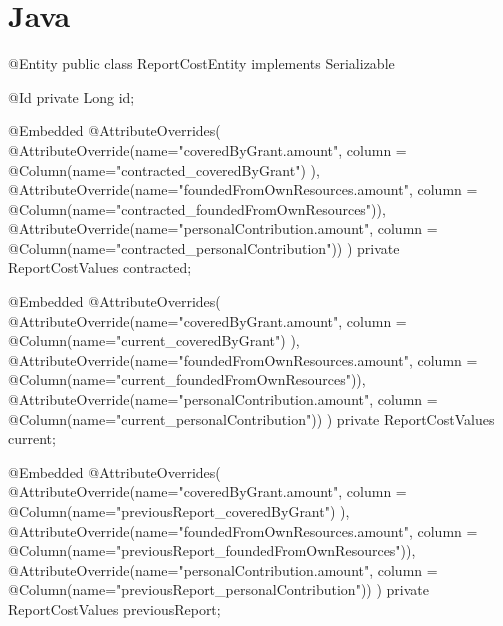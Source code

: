 \section{Java}

\begin{javacode}[Embeddable]
	@Entity 
	public class ReportCostEntity implements  Serializable {
		
		@Id
		private Long id;
		
		@Embedded   
		@AttributeOverrides( {
			@AttributeOverride(name="coveredByGrant.amount", column = @Column(name="contracted_coveredByGrant") ),
			@AttributeOverride(name="foundedFromOwnResources.amount", column = @Column(name="contracted_foundedFromOwnResources")),
			@AttributeOverride(name="personalContribution.amount", column = @Column(name="contracted_personalContribution"))
		} )
		private ReportCostValues contracted;
		
		@Embedded
		@AttributeOverrides( {
			@AttributeOverride(name="coveredByGrant.amount", column = @Column(name="current_coveredByGrant") ),
			@AttributeOverride(name="foundedFromOwnResources.amount", column = @Column(name="current_foundedFromOwnResources")),
			@AttributeOverride(name="personalContribution.amount", column = @Column(name="current_personalContribution"))
		} )
		private ReportCostValues current;
		
		@Embedded 
		@AttributeOverrides( {
			@AttributeOverride(name="coveredByGrant.amount", column = @Column(name="previousReport_coveredByGrant") ),
			@AttributeOverride(name="foundedFromOwnResources.amount", column = @Column(name="previousReport_foundedFromOwnResources")),
			@AttributeOverride(name="personalContribution.amount", column = @Column(name="previousReport_personalContribution"))
		} )
		private ReportCostValues previousReport;
	} 
\end{javacode}

